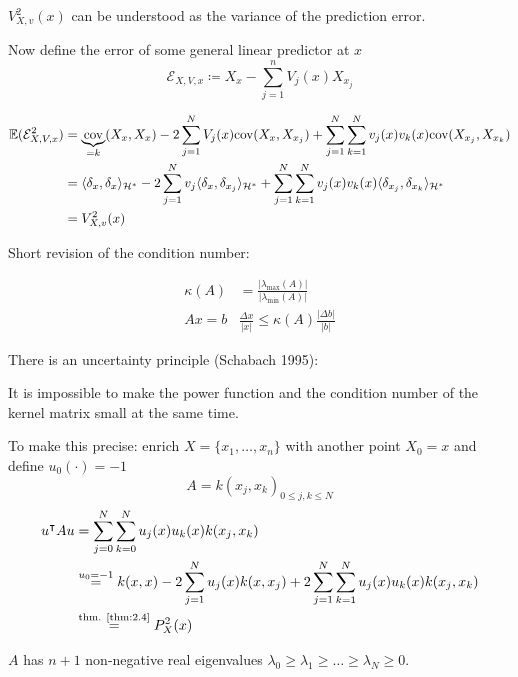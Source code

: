 $V_{X,v}^2(x)$ can be understood as the variance of the prediction error.

Now define the error of some general linear predictor at $x$
\[\mathcal{E}_{X,V,x}\coloneqq X_x-\sum_{j=1}^n V_j(x)X_{x_j}\] %


\begin{align*}
    \mathbb{E}(\mathcal{E}_{X,V,x}^2)&=\underbrace{\text{cov}}_{=k}(X_x,X_x)-2\sum_{j=1}^N V_j(x)\text{cov}(X_x,X_{x_j})+\sum_{j=1}^N\sum_{k=1}^N v_j(x)v_k(x)\text{cov}(X_{x_j},X_{x_k})\\
    &=\langle \delta_x, \delta_x\rangle_{\mathcal{H}^*}-2\sum_{j=1}^{N}v_j\langle \delta_x,\delta_{x_j}\rangle_{\mathcal{H}^*}+\sum_{j=1}^{N}\sum_{k=1}^N v_j(x)v_k(x)\langle \delta_{x_j},\delta_{x_k}\rangle_{\mathcal{H}^*}\\
    &=V_{X,v}^2(x)
\end{align*}

Short revision of the condition number:

\begin{align*}
    \kappa(A)&=\frac{|\lambda_{\max} (A)|}{|\lambda_{\min} (A)|}\\
    Ax=b & \frac{\Delta x}{|x|}\leq \kappa(A)\frac{|\Delta b|}{|b|}
\end{align*}


There is an uncertainty principle (Schabach 1995):

It is impossible to make the power function and the condition number 
of the kernel matrix small at the same time. 

To make this precise: enrich $X=\{x_1,\dots,x_n\}$ with another point $X_0=x$
and define $u_0(\cdot)=-1$
\[A=k(x_j,x_k)_{0\leq j,k\leq N}\]
\begin{align*}
    u^\intercal A u&=\sum_{j=0}^N\sum_{k=0}^N u_j(x)u_k(x)k(x_j,x_k)\\
    &\stackrel{u_0=-1}{=}k(x,x)-2\sum_{j=1}^Nu_j(x)k(x,x_j)+2\sum_{j=1}^N\sum_{k=1}^Nu_j(x)u_k(x)k(x_j,x_k)\\
    &\stackrel{\text{thm. \ref{thm:2.4}}}{=}P_X^2(x)
\end{align*}

$A$ has $n+1$ non-negative real eigenvalues $\lambda_0\geq \lambda_1\geq \dots\geq \lambda_N\geq 0$.

